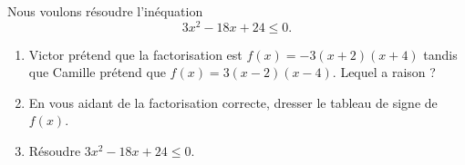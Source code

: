 
\begin{exercice}\label{exoPremiere-0089}

Nous voulons résoudre l'inéquation
\begin{equation}
    3x^2-18x+24\leq 0.
\end{equation}
\begin{enumerate}
    \item
        Victor prétend que la factorisation est \( f(x)=-3(x+2)(x+4)\) tandis que Camille prétend que \( f(x)=3(x-2)(x-4)\). Lequel a raison ?
    \item
        En vous aidant de la factorisation correcte, dresser le tableau de signe de \( f(x)\).
    \item
        Résoudre \( 3x^2-18x+24\leq 0\).
\end{enumerate}

\end{exercice}
